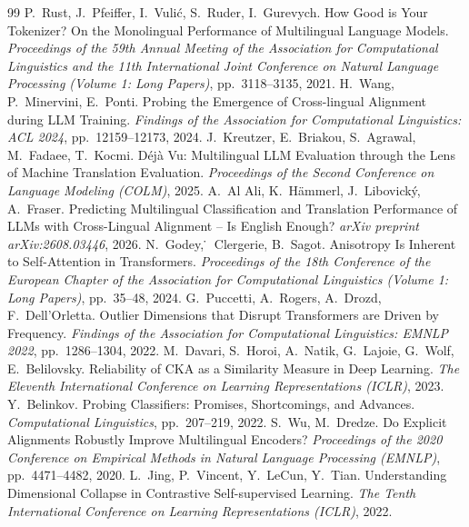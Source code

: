 \documentclass[11pt,a4paper]{article}
\begin{document}
\begin{thebibliography}{99}
P.~Rust, J.~Pfeiffer, I.~Vuli\'c, S.~Ruder, I.~Gurevych. How Good is Your Tokenizer? On the Monolingual Performance of Multilingual Language Models. \emph{Proceedings of the 59th Annual Meeting of the Association for Computational Linguistics and the 11th International Joint Conference on Natural Language Processing (Volume 1: Long Papers)}, pp.~3118--3135, 2021.
H.~Wang, P.~Minervini, E.~Ponti. Probing the Emergence of Cross-lingual Alignment during LLM Training. \emph{Findings of the Association for Computational Linguistics: ACL 2024}, pp.~12159--12173, 2024.
J.~Kreutzer, E.~Briakou, S.~Agrawal, M.~Fadaee, T.~Kocmi. D\'ej\`a Vu: Multilingual LLM Evaluation through the Lens of Machine Translation Evaluation. \emph{Proceedings of the Second Conference on Language Modeling (COLM)}, 2025.
A.~Al Ali, K.~H\"ammerl, J.~Libovick\'y, A.~Fraser. Predicting Multilingual Classification and Translation Performance of LLMs with Cross-Lingual Alignment -- Is English Enough? \emph{arXiv preprint arXiv:2608.03446}, 2026.
N.~Godey, \.~Clergerie, B.~Sagot. Anisotropy Is Inherent to Self-Attention in Transformers. \emph{Proceedings of the 18th Conference of the European Chapter of the Association for Computational Linguistics (Volume 1: Long Papers)}, pp.~35--48, 2024.
G.~Puccetti, A.~Rogers, A.~Drozd, F.~Dell'Orletta. Outlier Dimensions that Disrupt Transformers are Driven by Frequency. \emph{Findings of the Association for Computational Linguistics: EMNLP 2022}, pp.~1286--1304, 2022.
M.~Davari, S.~Horoi, A.~Natik, G.~Lajoie, G.~Wolf, E.~Belilovsky. Reliability of CKA as a Similarity Measure in Deep Learning. \emph{The Eleventh International Conference on Learning Representations (ICLR)}, 2023.
Y.~Belinkov. Probing Classifiers: Promises, Shortcomings, and Advances. \emph{Computational Linguistics}, pp.~207--219, 2022.
S.~Wu, M.~Dredze. Do Explicit Alignments Robustly Improve Multilingual Encoders? \emph{Proceedings of the 2020 Conference on Empirical Methods in Natural Language Processing (EMNLP)}, pp.~4471--4482, 2020.
L.~Jing, P.~Vincent, Y.~LeCun, Y.~Tian. Understanding Dimensional Collapse in Contrastive Self-supervised Learning. \emph{The Tenth International Conference on Learning Representations (ICLR)}, 2022.

\end{thebibliography}
\end{document}
